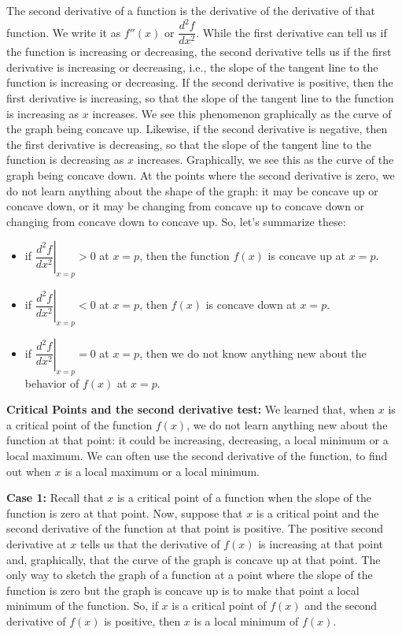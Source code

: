 \documentclass[conference,final,11pt,technote,onecolumn]{IEEEtran}\usepackage[]{graphicx}\usepackage[]{color}
\begin{document}
 The second derivative of a function is the derivative of the derivative of that function. We write it as $f''(x)$ or $\dfrac{d^2f}{dx^2}$. While the first derivative can tell us if the function is increasing or decreasing, the second derivative tells us if the first derivative is increasing or decreasing, i.e., the slope of the tangent line to the function is increasing or decreasing. If the second derivative is positive, then the first derivative is increasing, so that the slope of the tangent line to the function is increasing as $x$ increases. We see this phenomenon graphically as the curve of the graph being concave up. Likewise, if the second derivative is negative, then the first derivative is decreasing, so that the slope of the tangent line to the function is decreasing as $x$ increases. Graphically, we see this as the curve of the graph being concave down. At the points where the second derivative is zero, we do not learn anything about the shape of the graph: it may be concave up or concave down, or it may be changing from concave up to concave down or changing from concave down to concave up. So, let's summarize these:
 \begin{itemize}
 	\item if $\left.\dfrac{d^2f}{dx^2}\right|_{x=p} > 0$ at $x=p$, then the function $f(x)$ is concave up at $x=p$.
 	\item if $\left. \dfrac{d^2f}{dx^2}\right|_{x=p} < 0$ at $x=p$, then $f(x)$ is concave down at $x=p$.
 	\item if $\left. \dfrac{d^2f}{dx^2}\right|_{x=p} = 0$ at $x=p$, then we do not know anything new about the behavior of $f(x)$ at $x=p$.
 \end{itemize}
 
 \textbf{Critical Points and the second derivative test:} We learned that, when $x$ is a critical point of the function $f(x)$, we do not learn anything new about the function at that point: it could be increasing, decreasing, a local minimum or a local maximum. We can often use the second derivative of the function, to find out when $x$ is a local maximum or a local minimum.
 
 \textbf{Case 1:} Recall that $x$ is a critical point of a function when the slope of the function is zero at that point. Now, suppose that $x$ is a critical point and the second derivative of the function at that point is positive. The positive second derivative at $x$ tells us that the derivative of $f(x)$ is increasing at that point and, graphically, that the curve of the graph is concave up at that point. The only way to sketch the graph of a function at a point where the slope of the function is zero but the graph is concave up is to make that point a local minimum of the function. So, if $x$ is a critical point of $f(x)$ and the second derivative of $f(x)$ is positive, then $x$ is a local minimum of $f(x)$.
 
\end{document}
